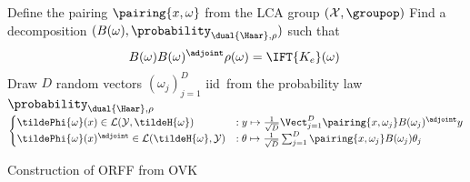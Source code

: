 \begin{center}
    \begin{algorithm2e}[H]\label{alg:ORFF_construction}
        \SetAlgoLined
        \BlankLine
        Define the pairing $\pairing{x, \omega}$ from the \acs{LCA} group
        $(\mathcal{X}, \groupop)$\; Find a decomposition
        $(B(\omega),\probability_{\dual{\Haar},\rho})$ such that
        \begin{dmath*}
            B(\omega)B(\omega)^\adjoint \rho(\omega)=\IFT{K_e}(\omega)\text{\;}
        \end{dmath*}
        \nl Draw $D$ random vectors $(\omega_j)_{j=1}^D$ \ac{iid}~from the
        probability law $\probability_{\dual{\Haar},\rho}$\;
        \nl \Return
        $\begin{cases}
            \tildePhi{\omega}(x) \in \mathcal{L}(\mathcal{Y}, \tildeH{\omega})
            &: y \mapsto \frac{1}{\sqrt{D}}\Vect_{j=1}^D\pairing{x,
            \omega_j}B(\omega_j)^\adjoint y \\
            \tildePhi{\omega}(x)^\adjoint \in\mathcal{L}(\tildeH{\omega},
            \mathcal{Y}) &: \theta \mapsto \frac{1}{\sqrt{D}} \sum_{j=1}^D
            \pairing{x, \omega_j}B(\omega_j)\theta_j
        \end{cases}$\;
        \caption{Construction of \acs{ORFF} from \acs{OVK}}
    \end{algorithm2e}
\end{center}


